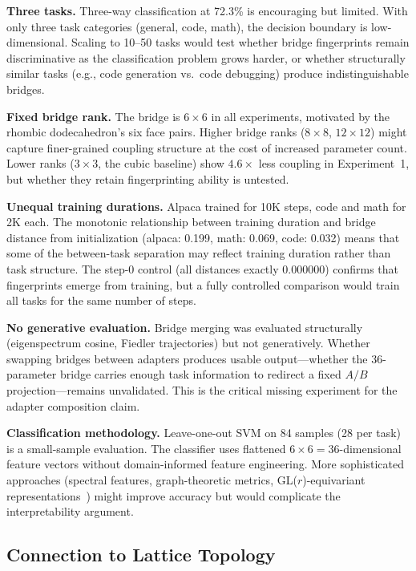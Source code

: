 \textbf{Three tasks.} Three-way classification at 72.3\% is
encouraging but limited. With only three task categories (general,
code, math), the decision boundary is low-dimensional. Scaling to
10--50 tasks would test whether bridge fingerprints remain
discriminative as the classification problem grows harder, or whether
structurally similar tasks (e.g., code generation vs.\ code
debugging) produce indistinguishable bridges.

\textbf{Fixed bridge rank.} The bridge is $6 \times 6$ in all
experiments, motivated by the rhombic dodecahedron's six face pairs.
Higher bridge ranks ($8 \times 8$, $12 \times 12$) might capture
finer-grained coupling structure at the cost of increased parameter
count. Lower ranks ($3 \times 3$, the cubic baseline) show
$4.6\times$ less coupling in Experiment~1, but whether they retain
fingerprinting ability is untested.

\textbf{Unequal training durations.} Alpaca trained for 10K steps,
code and math for 2K each. The monotonic relationship
between training duration and bridge distance from initialization
(alpaca: 0.199, math: 0.069, code: 0.032) means that some of the
between-task separation may reflect training duration rather than
task structure. The step-0 control (all distances exactly 0.000000)
confirms that fingerprints emerge from training, but a fully
controlled comparison would train all tasks for the same number of
steps.

\textbf{No generative evaluation.} Bridge merging was evaluated
structurally (eigenspectrum cosine, Fiedler trajectories) but not
generatively. Whether swapping bridges between adapters produces
usable output---whether the 36-parameter bridge carries enough
task information to redirect a fixed $A/B$ projection---remains
unvalidated. This is the critical missing experiment for the adapter
composition claim.

\textbf{Classification methodology.} Leave-one-out SVM on 84
samples (28 per task) is a small-sample evaluation. The classifier
uses flattened $6 \times 6 = 36$-dimensional feature vectors without
domain-informed feature engineering. More sophisticated approaches
(spectral features, graph-theoretic metrics, GL($r$)-equivariant
representations~\cite{putterman2024learning}) might improve
accuracy but would complicate the interpretability argument.

\subsection{Connection to Lattice Topology}
\label{sec:lattice-connection}

